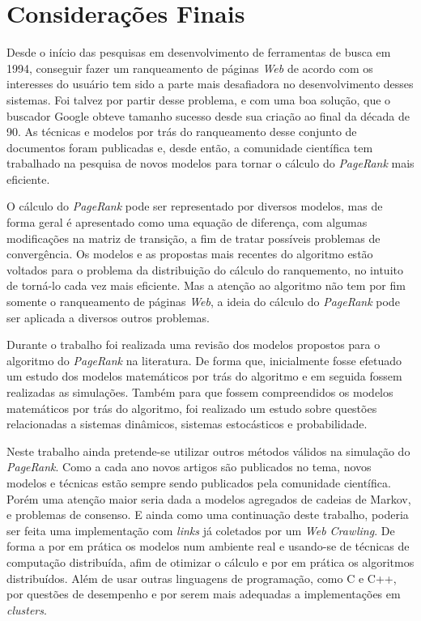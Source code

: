 \chapter{Considerações Finais}%

Desde o início das pesquisas em desenvolvimento de ferramentas de busca em 1994, conseguir fazer um ranqueamento de páginas \textit{Web} de acordo com os interesses do usuário tem sido a parte mais desafiadora no desenvolvimento desses sistemas. Foi talvez por partir desse problema, e com uma boa solução, que o buscador Google obteve tamanho sucesso desde sua criação ao final da década de 90. As técnicas e modelos por trás do ranqueamento desse conjunto de documentos foram publicadas e, desde então, a comunidade científica tem trabalhado na pesquisa de novos modelos para tornar o cálculo do \textit{PageRank} mais eficiente.

O cálculo do \textit{PageRank} pode ser representado por diversos modelos, mas de forma geral é apresentado como uma equação de diferença, com algumas modificações na matriz de transição, a fim de tratar possíveis problemas de convergência. Os modelos e as propostas mais recentes do algoritmo estão voltados para o problema da distribuição do cálculo do ranquemento, no intuito de torná-lo cada vez mais eficiente. Mas a atenção ao algoritmo não tem por fim somente o ranqueamento de páginas \textit{Web}, a ideia do cálculo do \textit{PageRank} pode ser aplicada a diversos outros problemas.

Durante o trabalho foi realizada uma revisão dos modelos propostos para o algoritmo do \textit{PageRank} na literatura. De forma que, inicialmente fosse efetuado um estudo dos modelos matemáticos por trás do algoritmo e em seguida fossem realizadas as simulações. Também para que fossem compreendidos os modelos matemáticos por trás do algoritmo, foi realizado um estudo sobre questões relacionadas a sistemas dinâmicos, sistemas estocásticos e probabilidade. %

Neste trabalho ainda pretende-se utilizar outros métodos válidos na simulação do \textit{PageRank}. Como a cada ano novos artigos são publicados no tema, novos modelos e técnicas estão sempre sendo publicados pela comunidade científica. Porém uma atenção maior seria dada a modelos agregados de cadeias de Markov, e problemas de consenso. E ainda como uma continuação deste trabalho, poderia ser feita uma implementação com \textit{links} já coletados por um \textit{Web Crawling}. De forma a por em prática os modelos num ambiente real e usando-se de técnicas de computação distribuída, afim de otimizar o cálculo e por em prática os algoritmos distribuídos. Além de usar outras linguagens de programação, como C e C++, por questões de desempenho e por serem mais adequadas a implementações em \textit{clusters}.